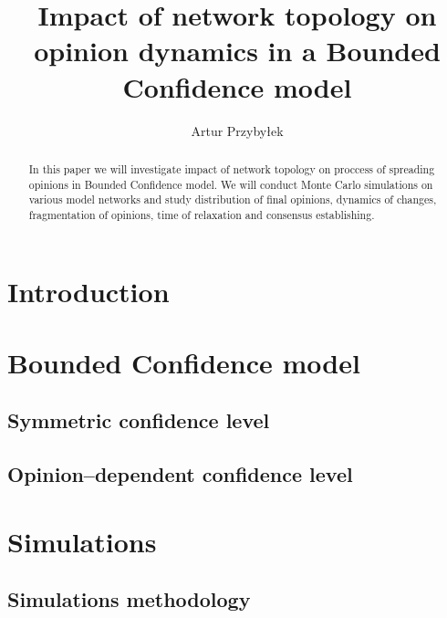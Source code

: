 \documentclass{article}
\title{Impact of network topology on opinion dynamics in a Bounded Confidence model}
\author{Artur Przybyłek}
\begin{document}
\begin{titlepage}
	\maketitle
	\begin{abstract}
	In this paper we will investigate impact of network topology on proccess of spreading opinions in Bounded Confidence model. We will conduct Monte Carlo simulations on various model networks and study distribution of final opinions, dynamics of changes, fragmentation of opinions, time of relaxation and consensus establishing.
	\end{abstract}
\end{titlepage}


\tableofcontents

\newpage

\section{Introduction}
\section{Bounded Confidence model}
	
\subsection{Symmetric confidence level}
\subsection{Opinion--dependent confidence level}

\section{Simulations}

\subsection{Simulations methodology}
\end{document}
